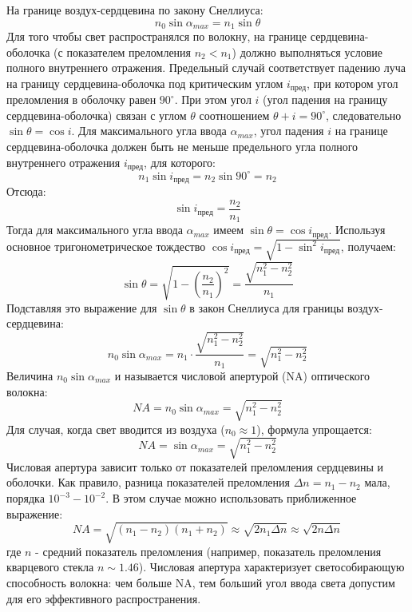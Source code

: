 На границе воздух-сердцевина по закону Снеллиуса:
\begin{equation}
    n_0 \sin\alpha_{max} = n_1 \sin\theta
\end{equation}
Для того чтобы свет распространялся по волокну, на границе сердцевина-оболочка (с показателем преломления $n_2 < n_1$) должно выполняться условие полного внутреннего отражения. Предельный случай соответствует падению луча на границу сердцевина-оболочка под критическим углом $i_{пред}$, при котором угол преломления в оболочку равен $90^\circ$. При этом угол $i$ (угол падения на границу сердцевина-оболочка) связан с углом $\theta$ соотношением $\theta + i = 90^\circ$, следовательно $\sin\theta = \cos i$.
Для максимального угла ввода $\alpha_{max}$, угол падения $i$ на границе сердцевина-оболочка должен быть не меньше предельного угла полного внутреннего отражения $i_{пред}$, для которого:
\begin{equation}
    n_1 \sin i_{пред} = n_2 \sin 90^\circ = n_2
\end{equation}
Отсюда:
\begin{equation}
    \sin i_{пред} = \frac{n_2}{n_1}
\end{equation}
Тогда для максимального угла ввода $\alpha_{max}$ имеем $\sin\theta = \cos i_{пред}$. Используя основное тригонометрическое тождество $\cos i_{пред} = \sqrt{1 - \sin^2 i_{пред}}$, получаем:
\begin{equation}
    \sin\theta = \sqrt{1 - \left(\frac{n_2}{n_1}\right)^2} = \frac{\sqrt{n_1^2 - n_2^2}}{n_1}
\end{equation}
Подставляя это выражение для $\sin\theta$ в закон Снеллиуса для границы воздух-сердцевина:
\begin{equation}
    n_0 \sin\alpha_{max} = n_1 \cdot \frac{\sqrt{n_1^2 - n_2^2}}{n_1} = \sqrt{n_1^2 - n_2^2}
\end{equation}
Величина $n_0 \sin\alpha_{max}$ и называется числовой апертурой (NA) оптического волокна:
\begin{equation}
    NA = n_0 \sin\alpha_{max} = \sqrt{n_1^2 - n_2^2}
    \label{eq:numerical_aperture}
\end{equation}
Для случая, когда свет вводится из воздуха ($n_0 \approx 1$), формула упрощается:
\begin{equation}
    NA = \sin\alpha_{max} = \sqrt{n_1^2 - n_2^2}
\end{equation}
Числовая апертура зависит только от показателей преломления сердцевины и оболочки. Как правило, разница показателей преломления $\Delta n = n_1 - n_2$ мала, порядка $10^{-3} - 10^{-2}$. В этом случае можно использовать приближенное выражение:
\begin{equation}
    NA = \sqrt{(n_1 - n_2)(n_1 + n_2)} \approx \sqrt{2n_1\Delta n} \approx \sqrt{2n\Delta n}
\end{equation}
где $n$ - средний показатель преломления (например, показатель преломления кварцевого стекла $n \sim 1.46$).
Числовая апертура характеризует светособирающую способность волокна: чем больше NA, тем больший угол ввода света допустим для его эффективного распространения.

